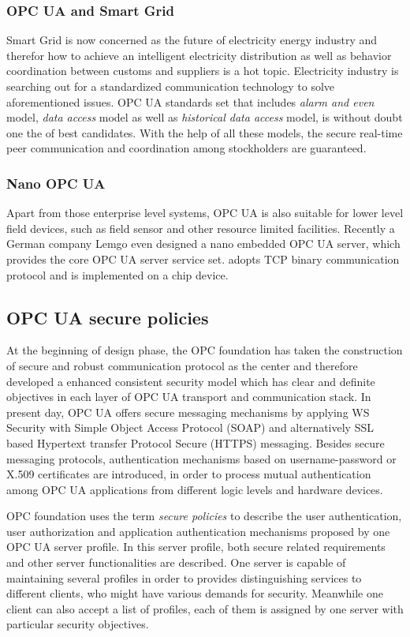 \subsubsection{OPC UA and  Smart Grid}
Smart Grid is now concerned as the future of electricity energy industry and therefor how to achieve an intelligent electricity distribution as well as behavior coordination between customs and suppliers is a hot topic\cite{opc_grid}. Electricity industry is searching out for a standardized communication technology to solve aforementioned issues.
OPC UA standards set that includes \emph{alarm and even} model, \emph{data access} model as well as  \emph{historical data access} model, is without doubt one the of best candidates. With the help of all these models, the secure real-time peer communication and coordination among stockholders are guaranteed.

\subsubsection{Nano OPC UA }
Apart from those enterprise level systems, OPC UA is also suitable for lower level field devices, such as field sensor and other resource limited facilities. Recently a German company Lemgo even designed a nano embedded OPC UA server\cite{opc_lemgo}, which provides the core OPC UA server service set. adopts TCP binary communication protocol and is implemented on a chip device.

\subsection{OPC UA secure policies}
At the beginning of design phase, the OPC foundation has taken the construction of secure and robust communication protocol as the center and therefore developed a enhanced consistent security model which has clear and definite objectives in each layer of OPC UA transport and communication stack. In present day, OPC UA  offers secure messaging mechanisms by applying WS Security with Simple Object Access Protocol (SOAP)  and alternatively SSL based Hypertext transfer Protocol Secure (HTTPS) messaging\cite{opc_secure_1}. Besides secure messaging protocols,  authentication mechanisms based on username-password or X.509 certificates are introduced, in order to process mutual authentication among OPC UA applications from different logic levels and hardware devices.

OPC foundation uses the term \emph{secure policies}\cite{O2} to describe the 
user authentication, user authorization and application authentication mechanisms proposed by one OPC UA server profile. In this server profile, both secure related requirements and other server functionalities are described. One server is capable of maintaining several profiles in order to provides distinguishing services to different clients, who might have various demands for security. Meanwhile one client can also accept a list of profiles, each of them is assigned by one server with particular security objectives. 

